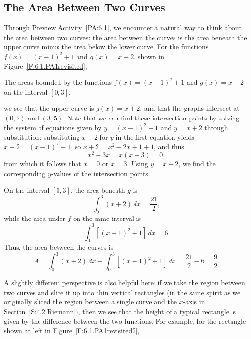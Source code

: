 
\subsection*{The Area Between Two Curves} 

Through Preview Activity~\ref{PA:6.1}, we encounter a natural way to think about the area between two curves:  the area between the curves is the area beneath the upper curve minus the area below the lower curve.    For the functions $f(x) = (x-1)^2 + 1$ and $g(x) = x+2$, shown in Figure~\ref{F:6.1.PA1revisited}, 
\begin{marginfigure} %
\caption{The areas bounded by the functions $f(x) = (x-1)^2 + 1$ and $g(x) = x+2$ on the interval $[0,3]$.} \label{F:6.1.PA1revisited}
\end{marginfigure}
we see that the upper curve is $g(x) = x+2$, and that the graphs intersect at $(0,2)$ and $(3,5)$.  Note that we can find these intersection points by solving the system of equations given by $y = (x-1)^2 + 1$ and $y = x+2$ through substitution:  substituting $x+2$ for $y$ in the first equation yields $x+2 = (x-1)^2 + 1$, so $x+2 = x^2 - 2x + 1 + 1$, and thus
\[ x^2 - 3x = x(x-3) = 0, \]
from which it follows that $x = 0$ or $x = 3$.  Using $y = x+2$, we find the corresponding $y$-values of the intersection points.

On the interval $[0,3]$, the area beneath $g$ is
\[ \int_0^3 (x+2) \, dx = \frac{21}{2}, \]
while the area under $f$ on the same interval is
\[ \int_0^3 [(x-1)^2 + 1] \, dx = 6. \]
Thus, the area between the curves is 
\begin{equation} \label{E:DiffOfInt} %
A = \int_0^3 (x+2) \, dx -  \int_0^3 [(x-1)^2 + 1] \, dx = \frac{21}{2} - 6 = \frac{9}{2}.
\end{equation}

A slightly different perspective is also helpful here:  if we take the region between two curves and slice it up into thin vertical rectangles (in the same spirit as we originally sliced the region between a single curve and the $x$-axis in Section~\ref{S:4.2.Riemann}), then we see that the height of a typical rectangle is given by the difference between the two functions.  For example, for the rectangle shown at left in Figure~\ref{F:6.1.PA1revisited2}, 

